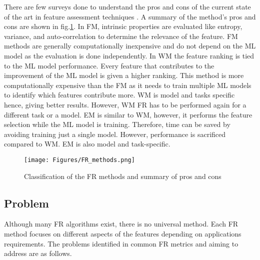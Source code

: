 \documentclass[11pt]{article}
\begin{document}
There are few surveys done to understand the pros and cons of the current state of the art in feature assessment techniques \cite{Uthman2020, Sangodiah2014, Effrosynidis2021, Jovic2015}. A summary of the method's pros and cons are shown in fig.\ref{fig: FR_methods}. In FM, intrinsic properties are evaluated like entropy, variance, and auto-correlation to determine the relevance of the feature. FM methods are generally computationally inexpensive and do not depend on the ML model as the evaluation is done independently. In WM the feature ranking is tied to the ML model performance. Every feature that contributes to the improvement of the ML model is given a higher ranking. This method is more computationally expensive than the FM as it needs to train multiple ML models to identify which features contribute more. WM is model and tasks specific hence, giving better results. However, WM FR has to be performed again for a different task or a model. EM is similar to WM, however, it performs the feature selection while the ML model is training. Therefore, time can be saved by avoiding training just a single model. However, performance is sacrificed compared to WM. EM is also model and task-specific. 

\begin{figure}[!t]
    \centering
    \texttt{[image: Figures/FR\_methods.png]}
     \caption{Classification of the FR methods and summary of pros and cons}
    \label{fig: FR_methods}
\end{figure}


\subsection{Problem}
Although many FR algorithms exist, there is no universal method. Each FR method focuses on different aspects of the features depending on applications requirements. The problems identified in common FR metrics and aiming to address are as follows.
\end{document}
